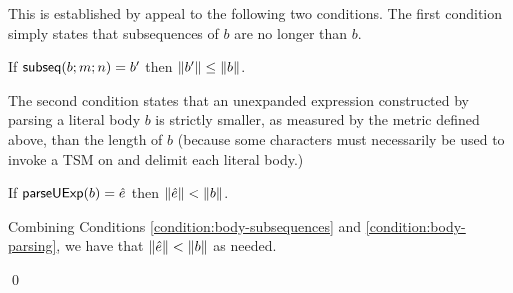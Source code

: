 This is established by appeal to the following two conditions. The first condition simply states that subsequences of $b$ are no longer than $b$.
\begin{condition}\label{condition:body-subsequences} If $\mathsf{subseq}(b; m; n)=b'$ then $\Vert b' \Vert \leq \Vert b \Vert$. \end{condition}
The second condition states that an unexpanded expression constructed by parsing a literal body $b$ is strictly smaller, as measured by the metric defined above, than the length of $b$ (because some characters must necessarily be used to invoke a TSM on and delimit each literal body.)
\begin{condition}\label{condition:body-parsing} If $\mathsf{parseUExp}(b)=\hat{e}$ then $\Vert \hat{e} \Vert < \Vert b \Vert$.\end{condition}

Combining Conditions \ref{condition:body-subsequences} and \ref{condition:body-parsing}, we have that $\Vert \hat{e} \Vert < \Vert b \Vert$ as needed.

\qed

